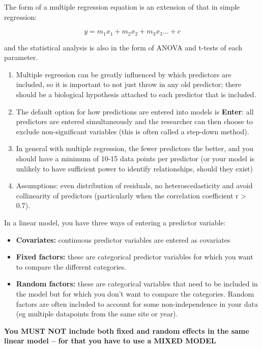 \documentclass[
]{book}
\providecommand{\tightlist}{%
  \setlength{\itemsep}{0pt}\setlength{\parskip}{0pt}}
\begin{document}
The form of a multiple regression equation is an extension of that in simple regression:

\[
y = m_1x_1+m_2x_2+m_3x_3...+c
\]

and the statistical analysis is also in the form of ANOVA and t-tests of each parameter.

\begin{enumerate}
\def\labelenumi{\arabic{enumi})}
\tightlist
\item
  Multiple regression can be greatly influenced by which predictors are included, so it is important to not just throw in any old predictor; there should be a biological hypothesis attached to each predictor that is included.
\item
  The default option for how predictions are entered into models is \textbf{Enter}: all predictors are entered simultaneously and the researcher can then choose to exclude non-significant variables (this is often called a step-down method).
\item
  In general with multiple regression, the fewer predictors the better, and you should have a minimum of 10-15 data points per predictor (or your model is unlikely to have sufficient power to identify relationships, should they exist)
\item
  Assumptions: even distribution of residuals, no heteroscedasticity and avoid collinearity of predictors (particularly when the correlation coefficient r \textgreater{} 0.7).
\end{enumerate}

In a linear model, you have three ways of entering a predictor variable:

\begin{itemize}
\tightlist
\item
  \textbf{Covariates:} continuous predictor variables are entered as covariates
\item
  \textbf{Fixed factors:} these are categorical predictor variables for which you want to compare the different categories.
\item
  \textbf{Random factors:} these are categorical variables that need to be included in the model but for which you don't want to compare the categories. Random factors are often included to account for some non-independence in your data (eg multiple datapoints from the same site or year).
\end{itemize}

\textbf{You MUST NOT include both fixed and random effects in the same linear model -- for that you have to use a MIXED MODEL}
\end{document}
